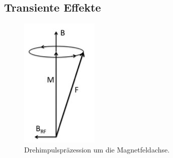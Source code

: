 \subsection{Transiente Effekte}

\begin{figure}[H]
	\centering
	\includegraphics[width=0.2\linewidth]{content/grafik/praezession.jpg}
	\caption{Drehimpulspräzession um die Magnetfeldachse. \cite{pumpen}}
	\label{fig:praezession}
\end{figure}

